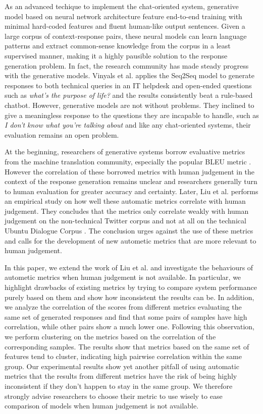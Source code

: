 \documentclass[runningheads]{llncs}
\begin{document}
    As an advanced techique to implement the chat-oriented system, generative model based on neural network architecture feature end-to-end training with minimal hard-coded features and fluent human-like output sentences. Given a large corpus of context-response pairs, these neural models can learn language patterns and extract common-sense knowledge from the corpus in a least supervised manner, making it a highly pausible solution to the response generation problem. In fact, the research community has made steady progress with the generative models. Vinyals et al. \cite{GoogleChatbot} applies the Seq2Seq model to generate responses to both technical queries in an IT helpdesk and open-ended questions such as \textit{what's the purpose of life?} and the results consistently beat a rule-based chatbot. However, generative models are not without problems. They inclined to give a meaningless response to the questions they are incapable to handle, such as \textit{I don't know what you're talking about} and like any chat-oriented systems, their evaluation remains an open problem.

    At the beginning, researchers of generative systems borrow evaluative metrics from the machine translation community, especially the popular BLEU metric \cite{BLEU}. However the correlation of these borrowed metrics with human judgement in the context of the response generation remains unclear and researchers generally turn to human evaluation for greater accuracy and certainty\cite{Shang,DCGM,VHRED}. Later, Liu et al. \cite{HowNot} performs an empirical study on how well these automatic metrics correlate with human judgement. They concludes that the metrics only correlate weakly with human judgement on the non-technical Twitter corpus and not at all on the technical Ubuntu Dialogue Corpus \cite{ubuntu_corpus}. The conclusion urges against the use of these metrics and calls for the development of new autometic metrics that are more relevant to human judgement.

    In this paper, we extend the work of Liu et al. and investigate the behaviours of autometic metrics when human judgement is not available. In particular, we highlight drawbacks of existing metrics by trying to compare system performance purely based on them and show how inconsistent the results can be. In addition, we analyze the correlation of the scores from different metrics evaluating the same set of generated responses and find that some pairs of samples have high correlation, while other pairs show a much lower one. Following this observation, we perform clustering on the metrics based on the correlation of the corresponding samples. The results show that metrics based on the same set of features tend to cluster, indicating high pairwise correlation within the same group. Our experimental results show yet another pitfall of using automatic metrics that the results from different metrics have the risk of being highly inconsistent if they don't happen to stay in the same group. We therefore strongly advise researchers to choose their metric to use wisely to ease comparison of models when human judgement is not available.
\end{document}
